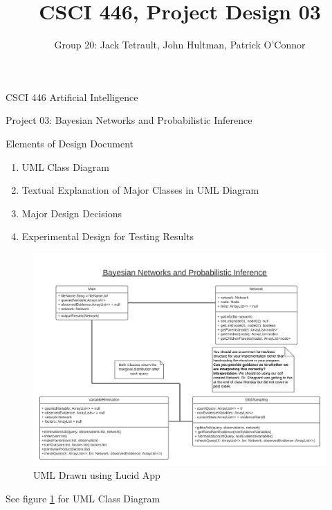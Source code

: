 \documentclass{article}
\title{CSCI 446, Project Design 03}
\author{Group 20: Jack Tetrault, John Hultman, Patrick O'Connor}
\begin{document}
\maketitle

CSCI 446 Artificial Intelligence

Project 03: Bayesian Networks and Probabilistic Inference

Elements of Design Document
\begin{enumerate}
    \item UML Class Diagram
    \item Textual Explanation of Major Classes in UML Diagram
    \item Major Design Decisions
    \item Experimental Design for Testing Results
\end{enumerate}




\begin{figure}
    \includegraphics[width=\textwidth]{BayesUMLDiagram.png}
    \caption{UML Drawn using Lucid App}
    \label{fig:num01}
\end{figure}
See figure \ref{fig:num01} for UML Class Diagram

\end{document}
